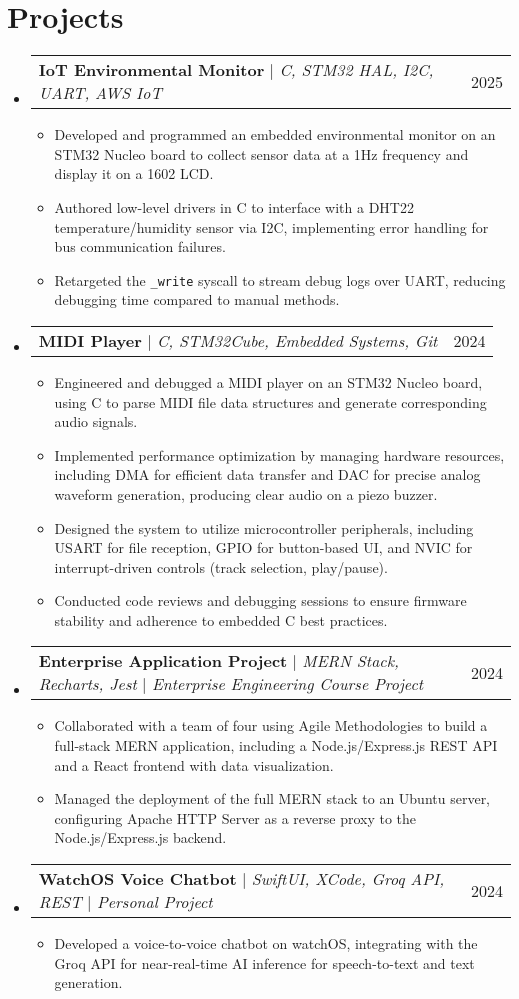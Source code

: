 \documentclass[letterpaper,11pt]{article}
\makeatletter
\newcommand{\resumeItem}[1]{
  \item\small{
    {#1 \vspace{-2pt}}
  }
}
\newcommand{\resumeProjectHeading}[2]{
    \item
    \begin{tabular*}{0.97\textwidth}{l@{\extracolsep{\fill}}r}
      \small#1 & #2 \\
    \end{tabular*}\vspace{-7pt}
}
\newcommand{\resumeSubHeadingListStart}{\begin{itemize}[leftmargin=0.15in, label={}]}
\newcommand{\resumeSubHeadingListEnd}{\end{itemize}}
\newcommand{\resumeItemListStart}{\begin{itemize}}
\newcommand{\resumeItemListEnd}{\end{itemize}\vspace{-5pt}}
\makeatother
\begin{document}
\section{Projects}
    \resumeSubHeadingListStart
    \resumeProjectHeading
        {\textbf{IoT Environmental Monitor} $|$ \emph{C, STM32 HAL, I2C, UART, AWS IoT}}{2025}
        \resumeItemListStart
          \resumeItem{Developed and programmed an embedded environmental monitor on an STM32 Nucleo board to collect sensor data at a 1Hz frequency and display it on a 1602 LCD.}
          \resumeItem{Authored low-level drivers in C to interface with a DHT22 temperature/humidity sensor via I2C, implementing error handling for bus communication failures.}
          \resumeItem{Retargeted the \texttt{\_write} syscall to stream debug logs over UART, reducing debugging time compared to manual methods.}
        \resumeItemListEnd
    \resumeProjectHeading
        {\textbf{MIDI Player} $|$ \emph{C, STM32Cube, Embedded Systems, Git}}{2024}
        \resumeItemListStart
            \resumeItem{Engineered and debugged a MIDI player on an STM32 Nucleo board, using C to parse MIDI file data structures and generate corresponding audio signals.}
            \resumeItem{Implemented performance optimization by managing hardware resources, including DMA for efficient data transfer and DAC for precise analog waveform generation, producing clear audio on a piezo buzzer.}
            \resumeItem{Designed the system to utilize microcontroller peripherals, including USART for file reception, GPIO for button-based UI, and NVIC for interrupt-driven controls (track selection, play/pause).}
            \resumeItem{Conducted code reviews and debugging sessions to ensure firmware stability and adherence to embedded C best practices.}
        \resumeItemListEnd
    \resumeProjectHeading
        {\textbf{Enterprise Application Project} $|$ \emph{MERN Stack, Recharts, Jest} $|$ \emph{Enterprise Engineering Course Project}}{2024}
        \resumeItemListStart
            \resumeItem{Collaborated with a team of four using Agile Methodologies to build a full-stack MERN application, including a Node.js/Express.js REST API and a React frontend with data visualization.}
            \resumeItem{Managed the deployment of the full MERN stack to an Ubuntu server, configuring Apache HTTP Server as a reverse proxy to the Node.js/Express.js backend.}
        \resumeItemListEnd
    \resumeProjectHeading
        {\textbf{WatchOS Voice Chatbot} $|$ \emph{SwiftUI, XCode, Groq API, REST} $|$ \emph{Personal Project}}{2024}
        \resumeItemListStart
            \resumeItem{Developed a voice-to-voice chatbot on watchOS, integrating with the Groq API for near-real-time AI inference for speech-to-text and text generation.}
        \resumeItemListEnd
      
    \resumeSubHeadingListEnd


  
\end{document}
